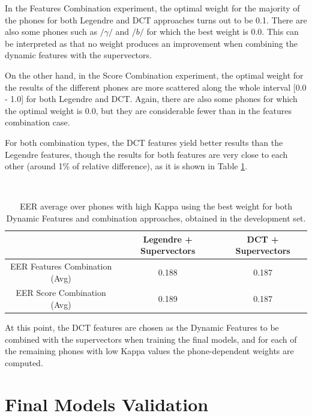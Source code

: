 In the Features Combination experiment,
the optimal weight for the majority of the phones
for both Legendre and DCT approaches turns out to be 0.1.
There are also some phones such as
$/\gamma/$ and $/b/$ for which the best weight is 0.0.
This can be interpreted as that
no weight produces an improvement when combining the dynamic features with the supervectors.

On the other hand, in the Score Combination experiment, the optimal weight for
the results of the different phones are more scattered along the whole interval [0.0 - 1.0]
for both Legendre and
DCT. Again, there are also some phones for which the optimal weight is 0.0, but they are
considerable fewer than in the features combination case.

For both combination types, the DCT features yield better results than the Legendre features,
though the results for both features are very close to each other (around 1\% of relative
difference), as it is shown in Table \ref{table:legendreVsDCTCombinations}.

~

\begin{table}[h]
	\renewcommand{\arraystretch}{1.5}
	\begin{center}
	    \begin{tabular}{ | c | c | c | }
	    \hline
	    & Legendre + Supervectors & DCT + Supervectors \\ \hline
	    EER Features Combination (Avg) & 0.188 & 0.187 \\ \hline
	    EER Score Combination (Avg) & 0.189  & 0.187 \\ \hline
	    \end{tabular}
	    \caption{EER average over phones with high Kappa using the best weight for
	    both Dynamic Features and combination approaches, obtained in the development set.}
	    \label{table:legendreVsDCTCombinations}
	\end{center}
\end{table}

At this point, the DCT features are chosen as the Dynamic Features to be combined with the
supervectors when training the final models, and for each of the remaining phones with
low Kappa values the phone-dependent weights are computed.

\section{Final Models Validation} \label{subsection:modelValidation}

